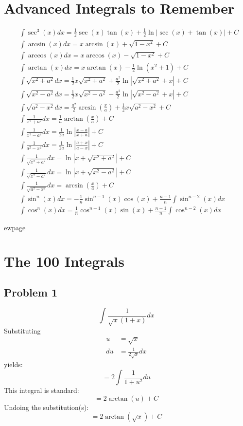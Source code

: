 \documentclass{article}
\begin{document}
\section{Advanced Integrals to Remember}
\begin{align*}
&\int\sec^3(x)dx=\frac{1}{2}\sec(x)\tan(x)+\frac{1}{2}\ln\left|\sec(x)+\tan(x)\right|+C \\
&\int\arcsin(x)dx=x\arcsin(x)+\sqrt{1-x^2}+C \\
&\int\arccos(x)dx=x\arccos(x)-\sqrt{1-x^2}+C \\
&\int\arctan(x)dx=x\arctan(x)-\frac{1}{2}\ln(x^2+1)+C \\
&\int\sqrt{x^2+a^2}dx=\frac{1}{2}x\sqrt{x^2+a^2}+\frac{a^2}{2}\ln\left|\sqrt{x^2+a^2}+x\right|+C \\
&\int\sqrt{x^2-a^2}dx=\frac{1}{2}x\sqrt{x^2-a^2}-\frac{a^2}{2}\ln\left|\sqrt{x^2-a^2}+x\right|+C \\
&\int\sqrt{a^2-x^2}dx=\frac{a^2}{2}\arcsin\left(\frac{x}{a}\right)+\frac{1}{2}x\sqrt{a^2-x^2}+C \\
&\int\frac{1}{x^2+a^2}dx=\frac{1}{a}\arctan\left(\frac{x}{a}\right)+C \\
&\int\frac{1}{x^2-a^2}dx=\frac{1}{2a}\ln\left|\frac{x-a}{x+a}\right|+C \\
&\int\frac{1}{a^2-x^2}dx=\frac{1}{2a}\ln\left|\frac{a+x}{a-x}\right|+C \\
&\int\frac{1}{\sqrt{x^2+a^2}}dx=\ln\left|x+\sqrt{x^2+a^2}\right|+C \\
&\int\frac{1}{\sqrt{x^2-a^2}}dx=\ln\left|x+\sqrt{x^2-a^2}\right|+C \\
&\int\frac{1}{\sqrt{a^2-x^2}}dx=\arcsin\left(\frac{x}{a}\right)+C \\
&\int\sin^n(x)dx=-\frac{1}{n}\sin^{n-1}(x)\cos(x)+\frac{n-1}{n}\int\sin^{n-2}(x)dx \\
&\int\cos^n(x)dx=\frac{1}{n}\cos^{n-1}(x)\sin(x)+\frac{n-1}{n}\int\cos^{n-2}(x)dx
\end{align*}

ewpage
\section{The 100 Integrals}
\subsection*{Problem 1}
$$\int\frac{1}{\sqrt{x}\left(1+x\right)}dx$$
Substituting
\begin{align*}
u&=\sqrt{x} \\
du&=\frac{1}{2\sqrt{x}}dx
\end{align*}
yields:
$$=2\int\frac{1}{1+u^2}du$$
This integral is standard:
$$=2\arctan(u)+C$$
Undoing the substitution(s):
$$=2\arctan\left(\sqrt{x}\right)+C$$
\end{document}
